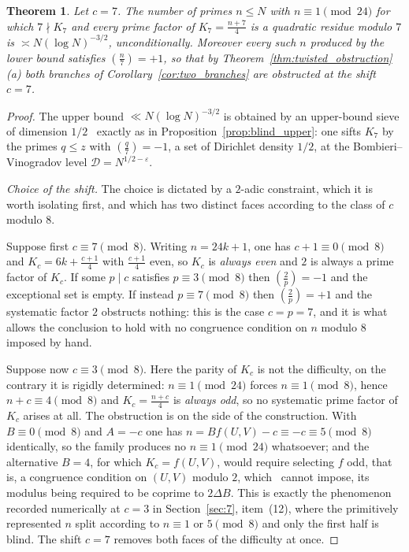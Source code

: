 \documentclass[11pt, a4paper]{article}
\theoremstyle{plain}
\newtheorem{theorem}{Theorem}[section]
\theoremstyle{definition}
\newcommand{\leg}[2]{\left(\frac{#1}{#2}\right)}
\begin{document}
\begin{theorem}\label{thm:blind_primes}
Let $c=7$. The number of primes $n\le N$ with $n\equiv1\pmod{24}$ for which $7\nmid K_7$ and every prime factor of $K_7=\frac{n+7}{4}$ is a quadratic residue modulo $7$ is $\asymp N(\log N)^{-3/2}$, unconditionally. Moreover every such $n$ produced by the lower bound satisfies $\leg n7=+1$, so that by Theorem~\ref{thm:twisted_obstruction}(a) \emph{both} branches of Corollary~\ref{cor:two_branches} are obstructed at the shift $c=7$.
\end{theorem}

\begin{proof}
The upper bound $\ll N(\log N)^{-3/2}$ is obtained by an upper-bound sieve of dimension $1/2$~\cite{halberstam_richert,friedlander_iwaniec} exactly as in Proposition~\ref{prop:blind_upper}: one sifts $K_7$ by the primes $q\le z$ with $\leg q7=-1$, a set of Dirichlet density $1/2$, at the Bombieri--Vinogradov level $\mathcal{D}=N^{1/2-\varepsilon}$.

\emph{Choice of the shift.} The choice is dictated by a $2$-adic constraint, which it is worth isolating first, and which has two distinct faces according to the class of $c$ modulo $8$.

Suppose first $c\equiv7\pmod8$. Writing $n=24k+1$, one has $c+1\equiv0\pmod 8$ and $K_c=6k+\frac{c+1}{4}$ with $\frac{c+1}{4}$ even, so $K_c$ is \emph{always even} and $2$ is always a prime factor of $K_c$. If some $p\mid c$ satisfies $p\equiv3\pmod8$ then $\leg2p=-1$ and the exceptional set is empty. If instead $p\equiv7\pmod8$ then $\leg2p=+1$ and the systematic factor $2$ obstructs nothing: this is the case $c=p=7$, and it is what allows the conclusion to hold with no congruence condition on $n$ modulo $8$ imposed by hand.

Suppose now $c\equiv3\pmod 8$. Here the parity of $K_c$ is not the difficulty, on the contrary it is rigidly determined: $n\equiv1\pmod{24}$ forces $n\equiv1\pmod 8$, hence $n+c\equiv4\pmod 8$ and $K_c=\frac{n+c}{4}$ is \emph{always odd}, so no systematic prime factor of $K_c$ arises at all. The obstruction is on the side of the construction. With $B\equiv0\pmod 8$ and $A=-c$ one has $n=Bf(U,V)-c\equiv-c\equiv5\pmod 8$ identically, so the family produces no $n\equiv1\pmod{24}$ whatsoever; and the alternative $B=4$, for which $K_c=f(U,V)$, would require selecting $f$ odd, that is, a congruence condition on $(U,V)$ modulo $2$, which~\cite[Thm.~1.1(2)]{fuchs2025} cannot impose, its modulus being required to be coprime to $2\Delta B$. This is exactly the phenomenon recorded numerically at $c=3$ in Section~\ref{sec:7}, item~(12), where the primitively represented $n$ split according to $n\equiv1$ or $5\pmod 8$ and only the first half is blind. The shift $c=7$ removes both faces of the difficulty at once.


\end{proof}
\end{document}
